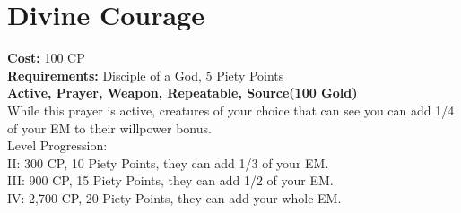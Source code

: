 \section{Divine Courage}\label{prayer:divineCourage}
\textbf{Cost:} 100 CP\\
\textbf{Requirements:} Disciple of a God, 5 Piety Points \\
\textbf{Active, Prayer, Weapon, Repeatable, Source(100 Gold)}\\
While this prayer is active, creatures of your choice that can see you can add 1/4 of your EM to their willpower bonus.
\\
Level Progression:\\
II: 300 CP, 10 Piety Points, they can add 1/3 of your EM.\\
III: 900 CP, 15 Piety Points, they can add 1/2 of your EM.\\
IV: 2,700 CP, 20 Piety Points, they can add your whole EM.\\